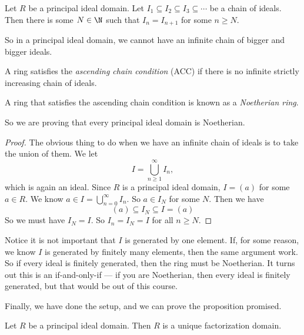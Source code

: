 \documentclass[a4paper]{article}
\begin{document}
\begin{lemma}
  Let $R$ be a principal ideal domain. Let $I_1 \subseteq I_2 \subseteq I_3 \subseteq \cdots$ be a chain of ideals. Then there is some $N\in \N$ such that $I_n = I_{n + 1}$ for some $n \geq N$.
\end{lemma}
So in a principal ideal domain, we cannot have an infinite chain of bigger and bigger ideals.

\begin{defi}
  A ring satisfies the \emph{ascending chain condition} (ACC) if there is no infinite strictly increasing chain of ideals.
\end{defi}

\begin{defi}
  A ring that satisfies the ascending chain condition is known as a \emph{Noetherian ring}.
\end{defi}

So we are proving that every principal ideal domain is Noetherian.

\begin{proof}
  The obvious thing to do when we have an infinite chain of ideals is to take the union of them. We let
  \[
    I = \bigcup_{n \geq 1}^\infty I_n,
  \]
  which is again an ideal. Since $R$ is a principal ideal domain, $I = (a)$ for some $a \in R$. We know $a \in I = \bigcup_{n = 0}^\infty I_n$. So $a \in I_N$ for some $N$. Then we have
  \[
    (a) \subseteq I_N \subseteq I = (a)
  \]
  So we must have $I_N = I$. So $I_n = I_N = I$ for all $n \geq N$.
\end{proof}
Notice it is not important that $I$ is generated by one element. If, for some reason, we know $I$ is generated by finitely many elements, then the same argument work. So if every ideal is finitely generated, then the ring must be Noetherian. It turns out this is an if-and-only-if --- if you are Noetherian, then every ideal is finitely generated, but that would be out of this course.

Finally, we have done the setup, and we can prove the proposition promised.
\begin{prop}
  Let $R$ be a principal ideal domain. Then $R$ is a unique factorization domain.
\end{prop}
\end{document}
